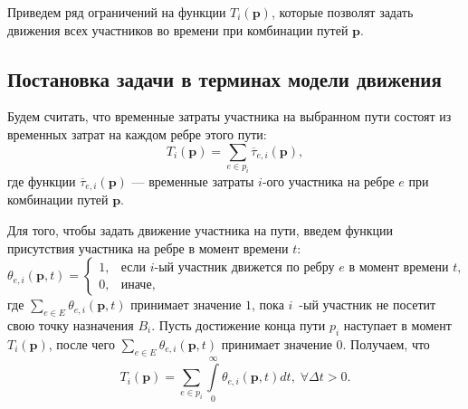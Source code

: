 \documentclass[12pt, a4paper]{article}
\begin{document}
Приведем ряд ограничений на функции $T_i (\textbf{p})$, которые позволят задать движения всех участников во времени при комбинации путей $\textbf{p}$.

\subsection{Постановка задачи в терминах модели движения}

\label{sec:concrete}
Будем считать, что временные затраты участника на выбранном пути состоят из временных затрат на каждом ребре этого пути:
$$T_i (\textbf{p}) = \sum \limits_{e \in p_i} \overline{\tau}_{e, i} (\textbf{p}), $$
где функции $\overline{\tau}_{e, i} (\textbf{p})$ --- временные затраты $i$-ого участника на ребре $e$ при комбинации путей $\textbf{p}$. 


Для того, чтобы задать движение участника на пути, введем функции присутствия участника на ребре в момент времени $t$:
$$
\theta_{e, i} (\textbf{p}, t) =
\begin{cases}
	1, & \text{если }  i\text{-ый участник движется по ребру $e$ в момент времени $t$,}  \\
	0, & \text{иначе},
\end{cases}
$$
где $\sum\limits_{e \in E} \theta_{e, i} (\textbf{p}, t)$ принимает значение $1$, пока $i$~-ый участник не посетит свою точку назначения $B_i$. Пусть достижение конца пути $p_i$ наступает в момент $T_i(\textbf{p})$, после чего $\sum\limits_{e \in E} \theta_{e, i} (\textbf{p}, t)$ принимает значение $0$. Получаем, что
\begin{equation}
	\label{eq:T_i_by_theta}
	T_i(\textbf{p}) = \sum \limits_{e \in p_i} \int\limits_{0}^{\infty} \theta_{e, i} (\textbf{p}, t) dt, \; \forall \Delta t > 0.
\end{equation}
\end{document}
